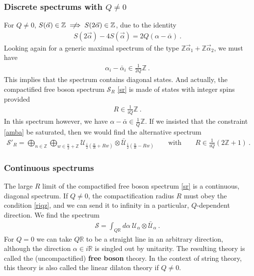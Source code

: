 \documentclass[12pt, a4paper, notitlepage, twoside]{report}
\numberwithin{equation}{section}
\theoremstyle{break}
\begin{document}
\subsubsection{Discrete spectrums with $Q\neq 0$}

For $Q\neq 0$, $S(\vec\alpha)\in\mathbb{Z}\centernot\implies S(2\vec\alpha)\in\mathbb{Z}$, due to the identity
\begin{align}
 S(2\vec\alpha) - 4 S(\vec\alpha) = 2Q(\alpha-\bar \alpha)\ .
\end{align}
Looking again for a generic maximal spectrum of the type $\mathbb{Z}\vec\alpha_1 + \mathbb{Z}\vec\alpha_2$, we must have 
\begin{align}
 \alpha_i-\bar\alpha_i\in \frac{1}{2Q}\mathbb{Z}\ .
 \label{amba}
\end{align}
This implies that the spectrum contains diagonal states. And actually, the compactified free boson spectrum $\mathcal{S}_R$ \eqref{sr} is made of states with integer spins provided
\begin{align}
 R \in \frac{1}{iQ}\mathbb{Z}\ .
 \label{riqz}
\end{align}
In this spectrum however, we have $\alpha-\bar\alpha\in\frac{1}{Q}\mathbb{Z}$. 
If we insisted that the constraint \eqref{amba} be saturated, then we would find the alternative spectrum
\begin{align}
 \mathcal{S}'_R = \bigoplus_{n\in \mathbb{Z}} \bigoplus_{w\in \frac{n}{2}+\mathbb{Z}} \mathcal{U}_{\frac{i}{2}\left(\frac{n}{R} + Rw\right)} \otimes \bar{\mathcal{U}}_{\frac{i}{2}\left(\frac{n}{R} - Rw\right)} \qquad \text{with}\qquad R \in \frac{1}{iQ}(2\mathbb{Z}+1)\ .
\end{align}


\subsubsection{Continuous spectrums}

The large $R$ limit of the compactified free boson spectrum \eqref{sr} is a continuous, diagonal spectrum.
If $Q\neq 0$, the compactification radius $R$ must obey the condition \eqref{riqz}, and we can send it to infinity in a particular, $Q$-dependent direction. We find the spectrum 
\begin{align}
 \boxed{ \mathcal{S} = \int_{Q\mathbb{R}} d\alpha\ \mathcal{U}_\alpha\otimes \bar{\mathcal{U}}_\alpha}\ .
 \label{sc}
\end{align}
For $Q=0$ we can take $Q\mathbb{R}$ to be a straight line in an arbitrary direction, although the direction $\alpha\in i\mathbb{R}$ is singled out by unitarity.   
The resulting theory is called the (uncompactified) \textbf{\boldmath free boson} theory.
In the context of string theory, this theory is also called the linear dilaton theory if $Q\neq 0$. 
\end{document}
